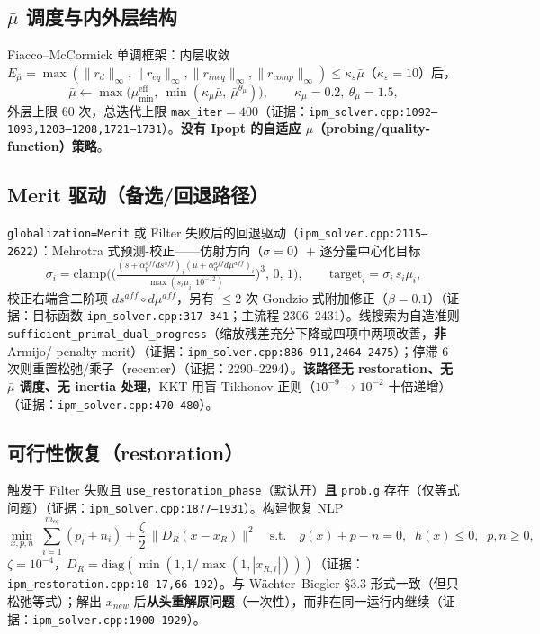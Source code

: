 \documentclass[11pt,a4paper]{ctexart}
\newcommand{\file}[1]{\texttt{#1}}
\newcommand{\func}[1]{\texttt{#1}}
\newcommand{\opt}[1]{\texttt{#1}}
\newcommand{\evid}[1]{{\footnotesize\color{black!70}（证据：#1）}}
\begin{document}
\subsection{$\bar\mu$ 调度与内外层结构}
Fiacco--McCormick 单调框架：内层收敛 $E_{\bar\mu}=\max(\|r_d\|_\infty,\|r_{eq}\|_\infty,\|r_{ineq}\|_\infty,\|r_{comp}\|_\infty)\le \kappa_\varepsilon \bar\mu$（$\kappa_\varepsilon{=}10$）后，
\begin{equation}
\bar\mu \leftarrow \max\big(\mu_{\min}^{\mathrm{eff}},\ \min(\kappa_\mu \bar\mu,\ \bar\mu^{\theta_\mu})\big),\qquad \kappa_\mu{=}0.2,\ \theta_\mu{=}1.5,
\end{equation}
外层上限 60 次，总迭代上限 \opt{max\_iter}${=}400$\evid{\file{ipm\_solver.cpp:1092--1093,1203--1208,1721--1731}}。\textbf{没有 Ipopt 的自适应 $\mu$（probing/quality-function）策略}。

\subsection{Merit 驱动（备选/回退路径）}
\opt{globalization=Merit} 或 Filter 失败后的回退驱动（\file{ipm\_solver.cpp:2115--2622}）：Mehrotra 式预测-校正——仿射方向（$\sigma{=}0$）+ 逐分量中心化目标
\begin{equation}
\sigma_i = \mathrm{clamp}\Big(\big(\tfrac{(s+\alpha_p^{aff} ds^{aff})_i(\mu+\alpha_d^{aff} d\mu^{aff})_i}{\max(s_i\mu_i,10^{-12})}\big)^3,\,0,\,1\Big),\qquad
\mathrm{target}_i = \sigma_i\, s_i\mu_i ,
\end{equation}
校正右端含二阶项 $ds^{aff}\circ d\mu^{aff}$，另有 $\le 2$ 次 Gondzio 式附加修正（$\beta{=}0.1$）\evid{目标函数 \file{ipm\_solver.cpp:317--341}；主流程 2306--2431}。线搜索为自造准则 \func{sufficient\_primal\_dual\_progress}（缩放残差充分下降或四项中两项改善，\textbf{非} Armijo/ penalty merit）\evid{\file{ipm\_solver.cpp:886--911,2464--2475}}；停滞 6 次则重置松弛/乘子（recenter）\evid{2290--2294}。\textbf{该路径无 restoration、无 $\bar\mu$ 调度、无 inertia 处理}，KKT 用盲 Tikhonov 正则（$10^{-9}\to10^{-2}$ 十倍递增）\evid{\file{ipm\_solver.cpp:470--480}}。

\subsection{可行性恢复（restoration）}
触发于 Filter 失败且 \opt{use\_restoration\_phase}（默认开）\textbf{且} \opt{prob.g} 存在（仅等式问题）\evid{\file{ipm\_solver.cpp:1877--1931}}。构建恢复 NLP
\begin{equation}
\min_{x,p,n}\; \sum_{i=1}^{m_{eq}}(p_i+n_i) + \frac{\zeta}{2}\, \|D_R(x-x_R)\|^2
\quad\text{s.t.}\quad g(x)+p-n=0,\;\; h(x)\le 0,\;\; p,n\ge 0,
\end{equation}
$\zeta=10^{-4}$，$D_R=\mathrm{diag}(\min(1,1/\max(1,|x_{R,i}|)))$\evid{\file{ipm\_restoration.cpp:10--17,66--192}}。与 Wächter--Biegler \S3.3 形式一致（但只松弛等式）；解出 $x_{new}$ 后\textbf{从头重解原问题}（一次性），而非在同一运行内继续\evid{\file{ipm\_solver.cpp:1900--1929}}。
\end{document}
